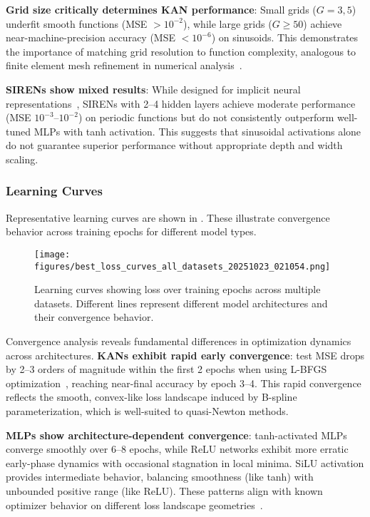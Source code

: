 \documentclass[11pt,a4paper]{article}
\begin{document}
\textbf{Grid size critically determines KAN performance}: Small grids ($G = 3, 5$) underfit smooth functions (MSE $> 10^{-2}$), while large grids ($G \geq 50$) achieve near-machine-precision accuracy (MSE $< 10^{-6}$) on sinusoids. This demonstrates the importance of matching grid resolution to function complexity, analogous to finite element mesh refinement in numerical analysis~\citep{huang2011adaptive}.

\textbf{SIRENs show mixed results}: While designed for implicit neural representations~\citep{sitzmann2020implicit}, SIRENs with 2--4 hidden layers achieve moderate performance (MSE $10^{-3}$--$10^{-2}$) on periodic functions but do not consistently outperform well-tuned MLPs with tanh activation. This suggests that sinusoidal activations alone do not guarantee superior performance without appropriate depth and width scaling.

\subsubsection{Learning Curves}

Representative learning curves are shown in . These illustrate convergence behavior across training epochs for different model types.

\begin{figure}[htbp]
\centering
\texttt{[image: figures/best\_loss\_curves\_all\_datasets\_20251023\_021054.png]}
\caption{Learning curves showing loss over training epochs across multiple datasets. Different lines represent different model architectures and their convergence behavior.}
\label{fig:s11_learning}
\end{figure}

Convergence analysis reveals fundamental differences in optimization dynamics across architectures. \textbf{KANs exhibit rapid early convergence}: test MSE drops by 2--3 orders of magnitude within the first 2 epochs when using L-BFGS optimization~\citep{liu1989limited}, reaching near-final accuracy by epoch 3--4. This rapid convergence reflects the smooth, convex-like loss landscape induced by B-spline parameterization, which is well-suited to quasi-Newton methods.

\textbf{MLPs show architecture-dependent convergence}: tanh-activated MLPs converge smoothly over 6--8 epochs, while ReLU networks exhibit more erratic early-phase dynamics with occasional stagnation in local minima. SiLU activation provides intermediate behavior, balancing smoothness (like tanh) with unbounded positive range (like ReLU). These patterns align with known optimizer behavior on different loss landscape geometries~\citep{kingma2015adam}.
\end{document}
